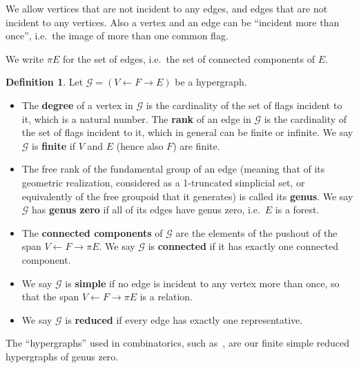 \documentclass{article}
\theoremstyle{definition}
\newtheorem{defn}[thm]{Definition}
\theoremstyle{remark}
\def\G{\mathcal{G}}
\let\ot\leftarrow
\begin{document}
We allow vertices that are not incident to any edges, and edges that are not incident to any vertices.
Also a vertex and an edge can be ``incident more than once'', i.e.\ the image of more than one common flag.

We write $\pi E$ for the set of edges, i.e.\ the set of connected components of $E$.

\begin{defn}
  Let $\G=(V\ot F\to E)$ be a hypergraph.
  \begin{itemize}
  \item The \textbf{degree} of a vertex in $\G$ is the cardinality of the set of flags incident to it, which is a natural number.
    The \textbf{rank} of an edge in $\G$ is the cardinality of the set of flags incident to it, which in general can be finite or infinite.
    We say $\G$ %
    is \textbf{finite} if $V$ and $E$ (hence also $F$) are finite.
  \item The free rank of the fundamental group of an edge (meaning that of its geometric realization, considered as a 1-truncated simplicial set, or equivalently of the free groupoid that it generates) is called its \textbf{genus}.
    We say $\G$ has \textbf{genus zero} if all of its edges have genus zero, i.e.\ $E$ is a forest.
  \item The \textbf{connected components} of $\G$ are the elements of the pushout of the span $V \leftarrow F \to \pi E$.
    We say $\G$ is \textbf{connected} if it has exactly one connected component.
  \item We say $\G$ is \textbf{simple} if no edge is incident to any vertex more than once, so that the span $V \ot F \to \pi E$ is a relation.
  \item We say $\G$ is \textbf{reduced} if every edge has exactly one representative.
  \end{itemize}
\end{defn}

The ``hypergraphs'' used in combinatorics, such as~\cite{glpn:directed-hypergraphs}, are our finite simple reduced hypergraphs of genus zero.
\end{document}
